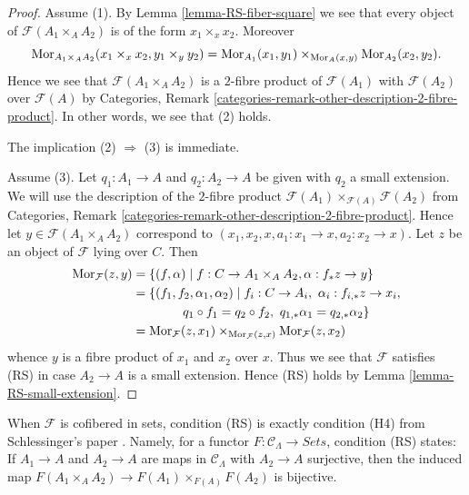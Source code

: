 \begin{proof}
Assume (1). By
Lemma \ref{lemma-RS-fiber-square}
we see that every object of $\mathcal{F}(A_1 \times_A A_2)$
is of the form $x_1 \times_x x_2$. Moreover
$$
\mathop{\mathrm{Mor}}\nolimits_{A_1 \times_A A_2}(x_1 \times_x x_2, y_1 \times_y y_2) =
\mathop{\mathrm{Mor}}\nolimits_{A_1}(x_1, y_1) \times_{\mathop{\mathrm{Mor}}\nolimits_A(x, y)}
\mathop{\mathrm{Mor}}\nolimits_{A_2}(x_2, y_2).
$$
Hence we see that $\mathcal{F}(A_1 \times_A A_2)$ is a $2$-fibre product
of $\mathcal{F}(A_1)$ with $\mathcal{F}(A_2)$ over $\mathcal{F}(A)$ by
Categories, Remark \ref{categories-remark-other-description-2-fibre-product}.
In other words, we see that (2) holds.

\medskip\noindent
The implication (2) $\Rightarrow$ (3) is immediate.

\medskip\noindent
Assume (3). Let $q_1 : A_1 \to A$ and $q_2 : A_2 \to A$ be given with
$q_2$ a small extension. We will use the description of the $2$-fibre product
$\mathcal{F}(A_1) \times_{\mathcal{F}(A)} \mathcal{F}(A_2)$ from
Categories, Remark \ref{categories-remark-other-description-2-fibre-product}.
Hence let $y \in \mathcal{F}(A_1 \times_A A_2)$ correspond to
$(x_1, x_2, x, a_1 : x_1 \to x, a_2 : x_2 \to x)$.
Let $z$ be an object of $\mathcal{F}$ lying over $C$. Then
\begin{align*}
\mathop{\mathrm{Mor}}\nolimits_\mathcal{F}(z, y) & =
\{(f, \alpha) \mid f : C \to A_1 \times_A A_2,
\alpha : f_*z \to y\} \\
& = \{(f_1, f_2, \alpha_1, \alpha_2) \mid
f_i : C \to A_i, \ \alpha_i : f_{i, *}z \to x_i, \\
& \quad\quad\quad\quad
q_1 \circ f_1 = q_2 \circ f_2, \ q_{1, *} \alpha_1 = q_{2, *}\alpha_2\} \\
& =
\mathop{\mathrm{Mor}}\nolimits_\mathcal{F}(z, x_1) \times_{\mathop{\mathrm{Mor}}\nolimits_\mathcal{F}(z, x)}
\mathop{\mathrm{Mor}}\nolimits_\mathcal{F}(z, x_2)
\end{align*}
whence $y$ is a fibre product of $x_1$ and $x_2$ over $x$. Thus we see
that $\mathcal{F}$ satisfies (RS) in case $A_2 \to A$ is a small extension.
Hence (RS) holds by
Lemma \ref{lemma-RS-small-extension}.
\end{proof}

\begin{remark}
\label{remark-compare-schlessinger-H4}
When $\mathcal{F}$ is cofibered in sets, condition (RS) is exactly condition
(H4) from Schlessinger's paper \cite[Theorem 2.11]{Sch}.  Namely, for
a functor $F: \mathcal{C}_\Lambda \to \textit{Sets}$, condition
(RS) states: If $A_1 \to A$ and $A_2 \to A$ are maps in
$\mathcal{C}_\Lambda$ with $A_2 \to A$ surjective, then the induced
map $F(A_1 \times_A A_2) \to F(A_1) \times_{F(A)} F(A_2)$ is
bijective.
\end{remark}

